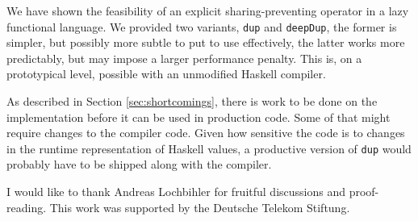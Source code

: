 \documentclass[preprint]{sigplanconf}
\theoremstyle{nonumberplain}
\newcommand{\li}{\lstinline[style=Haskell]}
\begin{document}
We have shown the feasibility of an explicit sharing-preventing operator in a lazy functional language. We provided two variants, \li-dup- and \li-deepDup-, the former is simpler, but possibly more subtle to put to use effectively, the latter works more predictably, but may impose a larger performance penalty. This is, on a prototypical level, possible with an unmodified Haskell compiler.

As described in Section \ref{sec:shortcomings}, there is work to be done on the implementation before it can be used in production code. Some of that might require changes to the compiler code. Given how sensitive the code is to changes in the runtime representation of Haskell values, a productive version of \li-dup- would probably have to be shipped along with the compiler.



\acks

I would like to thank Andreas Lochbihler for fruitful discussions and proof-reading. This work was supported by the Deutsche Telekom Stiftung.



\end{document}

